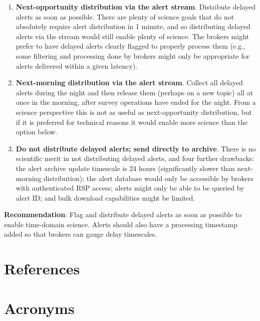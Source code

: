 \documentclass[DM,authoryear,toc]{lsstdoc}
\begin{document}
\begin{enumerate}
\item \textbf{Next-opportunity distribution via the alert stream}.
Distribute delayed alerts as soon as possible.
There are plenty of science goals that do not absolutely require alert distribution in 1 minute, and so distributing delayed alerts via the stream would still enable plenty of science.
The brokers might prefer to have delayed alerts clearly flagged to properly process them (e.g., some filtering and processing done by brokers might only be appropriate for alerts delivered within a given latency).
\item \textbf{Next-morning distribution via the alert stream}.
Collect all delayed alerts during the night and then release them (perhaps on a new topic) all at once in the morning, after survey operations have ended for the night.
From a science perspective this is not as useful as next-opportunity distribution, but if it is preferred for technical reasons it would enable more science than the option below.
\item \textbf{Do not distribute delayed alerts; send directly to archive}.
There is no scientific merit in not distributing delayed alerts, and four further drawbacks: the alert archive update timescale is 24 hours (significantly slower than next-morning distribution); the alert database would only be accessible by brokers with authenticated RSP access; alerts might only be able to be queried by alert ID; and bulk download capabilities might be limited.
\end{enumerate}

\textbf{Recommendation}: Flag and distribute delayed alerts as soon as possible to enable time-domain science.
Alerts should also have a processing timestamp added so that brokers can gauge delay timescales.

\appendix
\section{References} \label{sec:bib}
\renewcommand{\refname}{} %


\section{Acronyms} \label{sec:acronyms}

\end{document}
